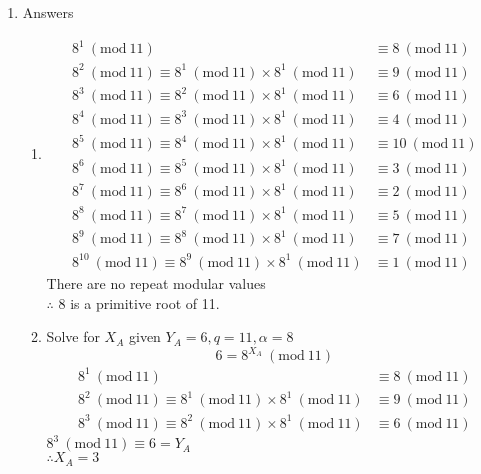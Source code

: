 \documentclass{article}
\newcommand{\Mod}[1]{\ (\mathrm{mod}\ #1)}
\begin{document}
\begin{enumerate}
    \item Answers
    \begin{enumerate}
        \item \begin{align*}
            8^1 \Mod{11} &\equiv 8 \Mod{11}\\
            8^2 \Mod{11} \equiv 8^1 \Mod{11} \times 8^1 \Mod{11} &\equiv 9 \Mod{11} \\
            8^3 \Mod{11} \equiv 8^2 \Mod{11} \times 8^1 \Mod{11} &\equiv 6 \Mod{11} \\
            8^4 \Mod{11} \equiv 8^3 \Mod{11} \times 8^1 \Mod{11} &\equiv 4 \Mod{11} \\
            8^5 \Mod{11} \equiv 8^4 \Mod{11} \times 8^1 \Mod{11} &\equiv 10 \Mod{11} \\
            8^6 \Mod{11} \equiv 8^5 \Mod{11} \times 8^1 \Mod{11} &\equiv 3 \Mod{11} \\
            8^7 \Mod{11} \equiv 8^6 \Mod{11} \times 8^1 \Mod{11} &\equiv 2 \Mod{11} \\
            8^8 \Mod{11} \equiv 8^7 \Mod{11} \times 8^1 \Mod{11} &\equiv 5 \Mod{11} \\
            8^9 \Mod{11} \equiv 8^8 \Mod{11} \times 8^1 \Mod{11} &\equiv 7 \Mod{11} \\
            8^{10} \Mod{11} \equiv 8^9 \Mod{11} \times 8^1 \Mod{11} &\equiv 1 \Mod{11} 
        \end{align*}
        There are no repeat modular values\\ $\therefore$ 8 is a primitive root of 11.

        \item Solve for $X_A$ given $Y_A = 6, q = 11, \alpha = 8$ \[6 = 8^{X_A} \Mod{11}\] 
        \begin{align*}
            8^1 \Mod{11} &\equiv 8 \Mod{11}\\
            8^2 \Mod{11} \equiv 8^1 \Mod{11} \times 8^1 \Mod{11} &\equiv 9 \Mod{11} \\
            8^3 \Mod{11} \equiv 8^2 \Mod{11} \times 8^1 \Mod{11} &\equiv 6 \Mod{11} 
        \end{align*}
        $8^3 \Mod{11} \equiv 6 = Y_A$ \\
        $\therefore X_A = 3$


\end{enumerate}
\end{enumerate}
\end{document}
